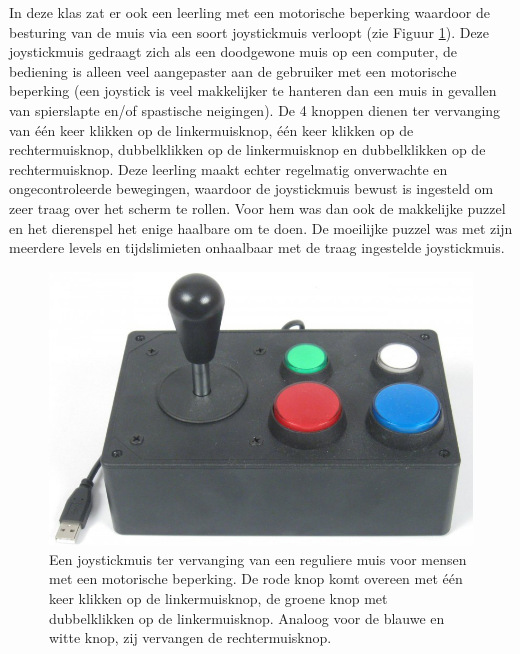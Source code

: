 \documentclass[a4paper,11pt]{article}
\theoremstyle{definition}
\begin{document}
\noindent In deze klas zat er ook een leerling met een motorische beperking 
waardoor de besturing van de muis via een soort joystickmuis verloopt (zie Figuur 
\ref{joy}). Deze joystickmuis gedraagt zich als een doodgewone muis op een 
computer, de bediening is alleen veel aangepaster aan de gebruiker met een 
motorische beperking (een joystick is veel makkelijker te hanteren dan een muis in gevallen van spierslapte en/of spastische neigingen). 
De 4 knoppen dienen ter vervanging van één keer klikken op de linkermuisknop, één 
keer klikken op de rechtermuisknop, dubbelklikken op de linkermuisknop en 
dubbelklikken op de rechtermuisknop.
Deze leerling maakt echter regelmatig onverwachte en ongecontroleerde 
bewegingen, waardoor de joystickmuis bewust is ingesteld om zeer traag over het 
scherm te rollen. Voor hem was dan ook de makkelijke puzzel en het dierenspel 
het enige haalbare om te doen. De moeilijke puzzel was met zijn meerdere levels 
en tijdslimieten onhaalbaar met de traag ingestelde joystickmuis.
 \begin{figure}[h!]
  \centering
  \includegraphics[scale=0.25]{joy.jpg}\caption{Een joystickmuis ter vervanging van een reguliere muis voor mensen met een motorische beperking. De rode knop komt overeen met één keer klikken op de linkermuisknop, de groene knop met dubbelklikken op de linkermuisknop. Analoog voor de blauwe en witte knop, zij vervangen de rechtermuisknop.}\label{joy}
\end{figure}
\end{document}

